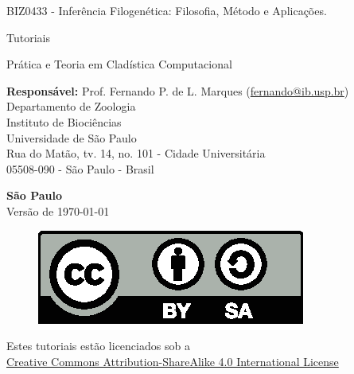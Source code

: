 \begin{titlepage}
\begin{center}%
\par
\vspace{90pt}
{\large \sc BIZ0433 - Inferência Filogenética: Filosofia, Método e Aplicações.}\par
\par
\vspace{90pt}
{\LARGE Tutoriais}\par
\vspace{10pt}
{\LARGE Prática e Teoria em Cladística Computacional}\par
\vspace{25pt}
\end{center}\par
\vspace{120pt}
\hspace*{40pt}\parbox{15cm}{{\textbf{Responsável:} Prof. Fernando P. de L. Marques (\href{mailto:fernando@ib.usp.br}{fernando@ib.usp.br})\\Departamento de Zoologia\\Instituto de Biociências\\Universidade de São Paulo\\ Rua do Matão, tv. 14, no. 101 - Cidade Universitária\\ 05508-090 - São Paulo - Brasil}}\par
\par\vfill\begin{center}
\textbf{{\large São Paulo}}\\
Versão de \large \today\\
  \begin{figure}[H]
      {\includegraphics[scale=0.6]{figures/by-sa.eps}}
  \end{figure}

{\small Estes tutoriais estão licenciados sob a\\
\href{http://creativecommons.org/licenses/by-sa/4.0/}{Creative Commons Attribution-ShareAlike 4.0 International License}}
\end{center}\end{titlepage}

\pagestyle{empty} %

\dominitoc %
\tableofcontents
\listoftables

\listoffigures
